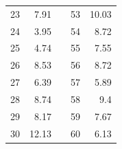 \begin{table}[H]
\begin{tabular}{|r|r|l|r|r|}
  23                                                        & 7.91                                                      &  & 53                                                                              & 10.03                                                                            \\ \cline{1-2} \cline{4-5} 
  24                                                        & 3.95                                                      &  & 54                                                                              & 8.72                                                                             \\ \cline{1-2} \cline{4-5} 
  25                                                        & 4.74                                                      &  & 55                                                                              & 7.55                                                                             \\ \cline{1-2} \cline{4-5} 
  26                                                        & 8.53                                                      &  & 56                                                                              & 8.72                                                                             \\ \cline{1-2} \cline{4-5} 
  27                                                        & 6.39                                                      &  & 57                                                                              & 5.89                                                                             \\ \cline{1-2} \cline{4-5} 
  28                                                        & 8.74                                                      &  & 58                                                                              & 9.4                                                                              \\ \cline{1-2} \cline{4-5} 
  29                                                        & 8.17                                                      &  & 59                                                                              & 7.67                                                                             \\ \cline{1-2} \cline{4-5} 
  30                                                        & 12.13                                                     &  & 60                                                                              & 6.13                                                                             \\ \cline{1-2} \cline{4-5} 
  \end{tabular}
  \end{table}

